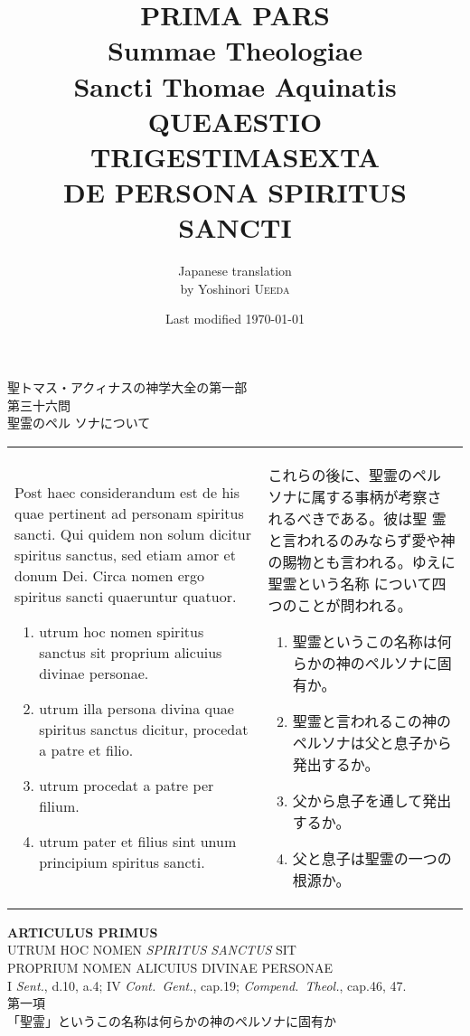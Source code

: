 \documentclass[10pt]{jsarticle} %
\title{{\bf PRIMA PARS}\\{\HUGE Summae Theologiae}\\Sancti Thomae
Aquinatis\\{\sffamily QUEAESTIO TRIGESTIMASEXTA}\\DE PERSONA SPIRITUS SANCTI}
\author{Japanese translation\\by Yoshinori {\scshape Ueeda}}
\date{Last modified \today}
\begin{document}
\maketitle

\begin{center}
{\Large 聖トマス・アクィナスの神学大全の第一部\\第三十六問\\聖霊のペル
 ソナについて}
\end{center}

\thispagestyle{empty}
\begin{longtable}{p{21em}p{21em}}

{\Huge P}ost haec considerandum est de his quae pertinent ad personam
 spiritus sancti. Qui quidem non solum dicitur spiritus sanctus, sed
 etiam amor et donum Dei. Circa nomen ergo spiritus sancti quaeruntur
 quatuor. 

\begin{enumerate}
 \item utrum hoc nomen spiritus sanctus sit proprium alicuius divinae personae.
 \item utrum illa persona divina quae spiritus sanctus dicitur, procedat a patre et filio.
 \item utrum procedat a patre per filium.
 \item utrum pater et filius sint unum principium spiritus sancti.
\end{enumerate}


&

これらの後に、聖霊のペルソナに属する事柄が考察されるべきである。彼は聖
 霊と言われるのみならず愛や神の賜物とも言われる。ゆえに聖霊という名称
 について四つのことが問われる。


\begin{enumerate}
 \item 聖霊というこの名称は何らかの神のペルソナに固有か。
 \item 聖霊と言われるこの神のペルソナは父と息子から発出するか。
 \item 父から息子を通して発出するか。
 \item 父と息子は聖霊の一つの根源か。
\end{enumerate}


\end{longtable}



\newpage





\begin{center}
{\Large {\bf ARTICULUS PRIMUS}}\\
{\large UTRUM HOC NOMEN {\itshape SPIRITUS SANCTUS} SIT \\PROPRIUM
 NOMEN ALICUIUS DIVINAE PERSONAE}\\
{\footnotesize I {\itshape Sent.}, d.10, a.4; IV {\itshape
 Cont.~Gent.}, cap.19; {\itshape Compend.~Theol.}, cap.46, 47. }\\
{\Large 第一項\\「聖霊」というこの名称は何らかの神のペルソナに固有か}
\end{center}
\end{document}
